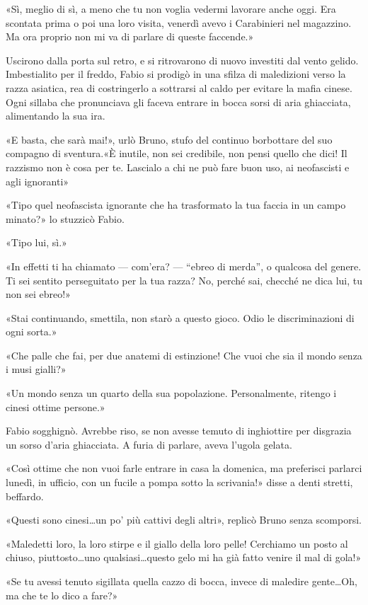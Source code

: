 «Sì, meglio di sì, a meno che tu non voglia vedermi lavorare anche oggi. Era scontata prima o poi una loro visita, venerdì avevo i Carabinieri nel magazzino. Ma ora proprio non mi va di parlare di queste faccende.»

Uscirono dalla porta sul retro, e si ritrovarono di nuovo investiti dal vento gelido. Imbestialito per il freddo, Fabio si prodigò in una sfilza di maledizioni verso la razza asiatica, rea di costringerlo a sottrarsi al caldo per evitare la mafia cinese. Ogni sillaba che pronunciava gli faceva entrare in bocca sorsi di aria ghiacciata, alimentando la sua ira.

«E basta, che sarà mai!», urlò Bruno, stufo del continuo borbottare del suo compagno di sventura.«È inutile, non sei credibile, non pensi quello che dici! Il razzismo non è cosa per te. Lascialo a chi ne può fare buon uso, ai neofascisti e agli ignoranti»

«Tipo quel neofascista ignorante che ha trasformato la tua faccia in un campo minato?» lo stuzzicò Fabio.

«Tipo lui, sì.»

«In effetti ti ha chiamato --- com'era? --- ``ebreo di merda'', o qualcosa del genere. Ti sei sentito perseguitato per la tua razza? No, perché sai, checché ne dica lui, tu non sei ebreo!»

«Stai continuando, smettila, non starò a questo gioco. Odio le discriminazioni di ogni sorta.»

«Che palle che fai, per due anatemi di estinzione! Che vuoi che sia il mondo senza i musi gialli?»

«Un mondo senza un quarto della sua popolazione. Personalmente, ritengo i cinesi ottime persone.»

Fabio sogghignò. Avrebbe riso, se non avesse temuto di inghiottire per disgrazia un sorso d'aria ghiacciata. A furia di parlare, aveva l'ugola gelata.

«Così ottime che non vuoi farle entrare in casa la domenica, ma preferisci parlarci lunedì, in ufficio, con un fucile a pompa sotto la scrivania!» disse a denti stretti, beffardo.

«Questi sono cinesi\ldots un po' più cattivi degli altri», replicò Bruno senza scomporsi.

«Maledetti loro, la loro stirpe e il giallo della loro pelle! Cerchiamo un posto al chiuso, piuttosto\ldots uno qualsiasi\ldots questo gelo mi ha già fatto venire il mal di gola!»

«Se tu avessi tenuto sigillata quella cazzo di bocca, invece di maledire gente\ldots Oh, ma che te lo dico a fare?»

